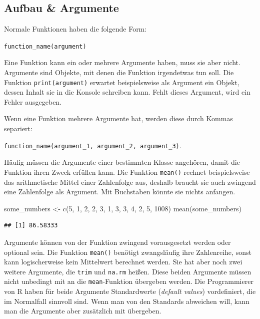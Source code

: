 \documentclass[
]{book}
\newenvironment{Shaded}{\begin{snugshade}}{\end{snugshade}}
\newcommand{\DecValTok}[1]{\textcolor[rgb]{0.00,0.00,0.81}{#1}}
\newcommand{\FunctionTok}[1]{\textcolor[rgb]{0.00,0.00,0.00}{#1}}
\newcommand{\NormalTok}[1]{#1}
\newcommand{\OtherTok}[1]{\textcolor[rgb]{0.56,0.35,0.01}{#1}}
\begin{document}
\hypertarget{aufbau-argumente}{%
\subsection{Aufbau \& Argumente}\label{aufbau-argumente}}

Normale Funktionen haben die folgende Form:

\texttt{function\_name(argument)}

Eine Funktion kann ein oder mehrere Argumente haben, muss sie aber nicht. Argumente sind Objekte, mit denen die Funktion irgendetwas tun soll. Die Funktion \texttt{print(argument)} erwartet beispielsweise als Argument ein Objekt, dessen Inhalt sie in die Konsole schreiben kann. Fehlt dieses Argument, wird ein Fehler ausgegeben.

Wenn eine Funktion mehrere Argumente hat, werden diese durch Kommas separiert:

\texttt{function\_name(argument\_1,\ argument\_2,\ argument\_3)}.

Häufig müssen die Argumente einer bestimmten Klasse angehören, damit die Funktion ihren Zweck erfüllen kann. Die Funktion \texttt{mean()} rechnet beispielsweise das arithmetische Mittel einer Zahlenfolge aus, deshalb braucht sie auch zwingend eine Zahlenfolge als Argument. Mit Buchstaben könnte sie nichts anfangen.

\begin{Shaded}
\begin{Highlighting}[]
\NormalTok{some\_numbers }\OtherTok{\textless{}{-}} \FunctionTok{c}\NormalTok{(}\DecValTok{5}\NormalTok{, }\DecValTok{1}\NormalTok{, }\DecValTok{2}\NormalTok{, }\DecValTok{2}\NormalTok{, }\DecValTok{3}\NormalTok{, }\DecValTok{1}\NormalTok{, }\DecValTok{3}\NormalTok{, }\DecValTok{3}\NormalTok{, }\DecValTok{4}\NormalTok{, }\DecValTok{2}\NormalTok{, }\DecValTok{5}\NormalTok{, }\DecValTok{1008}\NormalTok{)}
\FunctionTok{mean}\NormalTok{(some\_numbers)}
\end{Highlighting}
\end{Shaded}

\begin{verbatim}
## [1] 86.58333
\end{verbatim}

Argumente können von der Funktion zwingend vorausgesetzt werden oder optional sein. Die Funktion \texttt{mean()} benötigt zwangsläufig ihre Zahlenreihe, sonst kann logischerweise kein Mittelwert berechnet werden. Sie hat aber noch zwei weitere Argumente, die \texttt{trim} und \texttt{na.rm} heißen. Diese beiden Argumente müssen nicht unbedingt mit an die \texttt{mean}-Funktion übergeben werden. Die Programmierer von R haben für beide Argumente Standardwerte (\emph{default values}) vordefiniert, die im Normalfall sinnvoll sind. Wenn man von den Standards abweichen will, kann man die Argumente aber zusätzlich mit übergeben.
\end{document}
